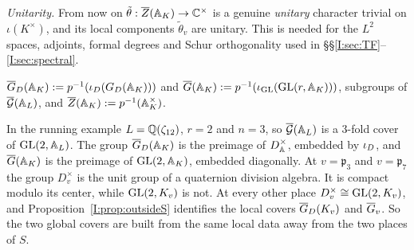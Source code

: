 \emph{Unitarity.} From now on $\tilde\theta:\overline{Z}(\mathbb{A}_K)\to\mathbb{C}^\times$ is a genuine \emph{unitary} character trivial on $\iota(K^\times)$, and its local components $\tilde\theta_v$ are unitary. This is needed for the $L^2$ spaces, adjoints, formal degrees and Schur orthogonality used in \S\S\ref{I:sec:TF}--\ref{I:sec:spectral}.

\begin{definition}
$\overline{G}_D(\mathbb{A}_K):=p^{-1}(\iota_D(G_D(\mathbb{A}_K)))$ and $\overline{G}(\mathbb{A}_K):=p^{-1}(\iota_{\mathrm{GL}}(\mathrm{GL}(r,\mathbb{A}_K)))$, subgroups of $\overline{\mathcal{G}}(\mathbb{A}_L)$, and $\overline{Z}(\mathbb{A}_K):=p^{-1}(\mathbb{A}_K^\times)$.
\end{definition}

\begin{example}\label{I:ex:globalcovers}
In the running example $L=\mathbb{Q}(\zeta_{12})$, $r=2$ and $n=3$, so $\overline{\mathcal{G}}(\mathbb{A}_L)$ is a $3$-fold cover of $\mathrm{GL}(2,\mathbb{A}_L)$. The group $\overline{G}_D(\mathbb{A}_K)$ is the preimage of $D^\times_{\mathbb{A}}$, embedded by $\iota_D$, and $\overline{G}(\mathbb{A}_K)$ is the preimage of $\mathrm{GL}(2,\mathbb{A}_K)$, embedded diagonally. At $v=\mathfrak p_3$ and $v=\mathfrak p_7$ the group $D_v^\times$ is the unit group of a quaternion division algebra. It is compact modulo its center, while $\mathrm{GL}(2,K_v)$ is not. At every other place $D_v^\times\cong\mathrm{GL}(2,K_v)$, and Proposition~\ref{I:prop:outsideS} identifies the local covers $\overline{G}_D(K_v)$ and $\overline{G}_v$. So the two global covers are built from the same local data away from the two places of $S$.
\end{example}


